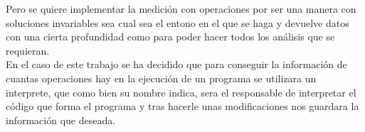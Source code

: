  
Pero se quiere implementar la medición con operaciones por ser una  manera con soluciones invariables sea cual sea el entono en el que se haga y devuelve datos con una cierta profundidad como para poder hacer todos los análisis que se requieran.\\

En el caso de este trabajo se ha decidido que para conseguir la información de cuantas operaciones hay en la ejecución de un programa se utilizara un interprete, que como bien su nombre indica, sera el responsable de interpretar el código que forma el programa y tras hacerle unas modificaciones nos guardara  la información que deseada. 



